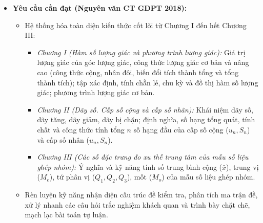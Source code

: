 \documentclass[12pt, a4paper]{article}
\begin{document}
\begin{itemize}[leftmargin=1.2cm]
    \item \textbf{Yêu cầu cần đạt (Nguyên văn CT GDPT 2018):}
    \begin{itemize}[leftmargin=0.6cm]
        \item Hệ thống hóa toàn diện kiến thức cốt lõi từ Chương I đến hết Chương III:
        \begin{itemize}
            \item \textit{Chương I (Hàm số lượng giác và phương trình lượng giác):} Giá trị lượng giác của góc lượng giác, công thức lượng giác cơ bản và nâng cao (công thức cộng, nhân đôi, biến đổi tích thành tổng và tổng thành tích); tập xác định, tính chẵn lẻ, chu kỳ và đồ thị hàm số lượng giác; phương trình lượng giác cơ bản.
            \item \textit{Chương II (Dãy số. Cấp số cộng và cấp số nhân):} Khái niệm dãy số, dãy tăng, dãy giảm, dãy bị chặn; định nghĩa, số hạng tổng quát, tính chất và công thức tính tổng $n$ số hạng đầu của cấp số cộng ($u_n, S_n$) và cấp số nhân ($u_n, S_n$).
            \item \textit{Chương III (Các số đặc trưng đo xu thế trung tâm của mẫu số liệu ghép nhóm):} Ý nghĩa và kỹ năng tính số trung bình cộng ($\bar{x}$), trung vị ($M_e$), tứ phân vị ($Q_1, Q_2, Q_3$), mốt ($M_o$) của mẫu số liệu ghép nhóm.
        \end{itemize}
        \item Rèn luyện kỹ năng nhận diện cấu trúc đề kiểm tra, phân tích ma trận đề, xử lý nhanh các câu hỏi trắc nghiệm khách quan và trình bày chặt chẽ, mạch lạc bài toán tự luận.
    \end{itemize}


\end{itemize}
\end{document}
